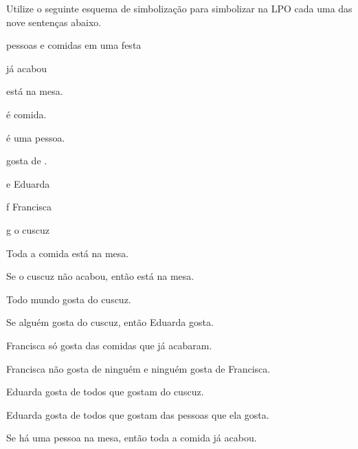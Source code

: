 \problempart
Utilize o seguinte esquema de simbolização para simbolizar na LPO cada uma das nove sentenças abaixo.
\begin{center}
\begin{ekey}
\item[\text{domínio}] pessoas e comidas em uma festa
\item[\atom{F}{x}]  já acabou
\item[\atom{M}{x}]  está na mesa.
\item[\atom{C}{x}]  é comida.
\item[\atom{P}{x}]  é uma pessoa.
\item[\atom{G}{x,y}]  gosta de .
\item[e] Eduarda
\item[f] Francisca
\item[g] o cuscuz
\end{ekey}
\end{center}
\begin{earg}
\item Toda a comida está na mesa.
\item Se o cuscuz não acabou, então está na mesa.
\item Todo mundo gosta do cuscuz.
\item Se alguém gosta do cuscuz, então Eduarda gosta.
\item Francisca só gosta das comidas que já acabaram.
\item Francisca não gosta de ninguém e ninguém gosta de Francisca.
\item Eduarda gosta de todos que gostam do cuscuz.
\item Eduarda gosta de todos que gostam das pessoas que ela gosta.
\item Se há uma pessoa na mesa, então toda a comida já acabou.
\end{earg}


